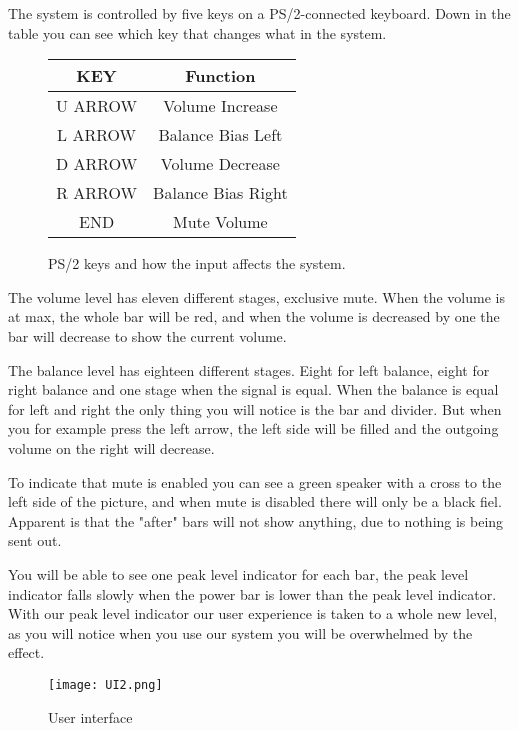The system is controlled by five keys on a PS/2-connected keyboard. Down in the table you can see which key that changes what in the system.


\begin{figure}[h]
\centering
\begin{tabular}{|c|c|}
\hline
KEY & Function\\ \hline
U ARROW & Volume Increase\\ \hline
L ARROW & Balance Bias Left\\ \hline
D ARROW &  Volume Decrease\\ \hline
R ARROW &  Balance Bias Right\\ \hline
END		&  Mute Volume\\ \hline
\end{tabular}
\caption{PS/2 keys and how the input affects the system.}
\label{fig:scancodes}
\end{figure}


The volume level has eleven different stages, exclusive mute. When the volume is at max, the whole bar will be red, and when the volume is decreased by one the bar will decrease to show the current volume.

The balance level has eighteen different stages. Eight for left balance, eight for right balance and one stage when the signal is equal. When the balance is equal for left and right the only thing you will notice is the bar and divider. But when you for example press the left arrow, the left side will be filled and the outgoing volume on the right will decrease.

To indicate that mute is enabled you can see a green speaker with a cross to the left side of the picture, and when mute is disabled there will only be a black fiel. Apparent is that the "after" bars will not show anything, due to nothing is being sent out. 

You will be able to see one peak level indicator for each bar, the peak level indicator falls slowly when the power bar is lower than the peak level indicator. With our peak level indicator our user experience is taken to a whole new level, as you will notice when you use our system you will be overwhelmed by the effect.

\begin{figure}[h]
	\centering
        \texttt{[image: UI2.png]}
       \caption{User interface}
        \label{fig:user interface}
\end{figure}



